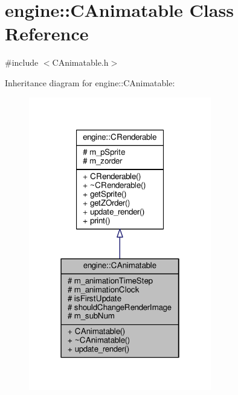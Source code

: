 \hypertarget{classengine_1_1CAnimatable}{\section{engine\-:\-:C\-Animatable Class Reference}
\label{classengine_1_1CAnimatable}
}


{\ttfamily \#include $<$C\-Animatable.\-h$>$}



Inheritance diagram for engine\-:\-:C\-Animatable\-:
\nopagebreak
\begin{figure}[H]
\begin{center}
\leavevmode
\includegraphics[width=226pt]{classengine_1_1CAnimatable__inherit__graph}
\end{center}
\end{figure}


